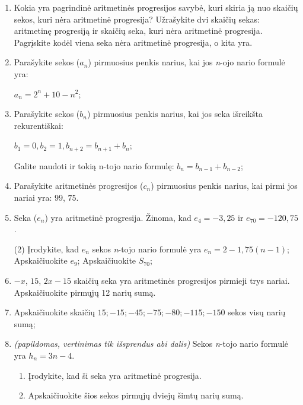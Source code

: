 \documentclass[a4paper]{article}
\begin{document}
\begin{enumerate}
      \item Kokia yra pagrindinė aritmetinės progresijos savybė, kuri skiria ją
            nuo skaičių sekos, kuri nėra aritmetinė progresija? Užrašykite dvi
            skaičių sekas: aritmetinę progresiją ir skaičių seka, kuri nėra
            aritmetinė progresija. Pagrįskite kodėl viena seka nėra
            aritmetinė progresija, o kita yra.

      \item Parašykite sekos ($a_{n}$) pirmuosius penkis
            narius, kai jos \textit{n}-ojo nario formulė yra:

            $a_{n}=2^n+10-n^2$;

      \item Parašykite sekos ($b_{n}$) pirmuosius penkis
            narius, kai jos seka išreikšta rekurentiškai:

            $b_1 = 0, b_2 = 1, b_{n+2}=b_{n+1}+b_{n}$;

            Galite naudoti ir tokią n-tojo nario formulę: 
            $b_{n}=b_{n-1}+b_{n-2}$;

      \item Parašykite aritmetinės progresijos ($c_{n}$) pirmuosius penkis
            narius, kai pirmi jos nariai yra: $99$, $75$.

      \item Seka ($e_{n}$) yra aritmetinė progresija. Žinoma, kad $e_{4}=-3,25$ ir
            $e_{70}=-120,75$.

            \begin{tasks}[item-format={\normalfont}, after-item-skip=2mm](2)
                  \task* Įrodykite, kad $e_{n}$ sekos \textit{n}-tojo nario
                  formulė yra $e_{n}=2-1,75(n-1)$;
                  \task Apskaičiuokite $e_{9}$;
                  \task Apskaičiuokite $S_{70}$;
            \end{tasks}

      \item $ -x $, $ 15 $, $ 2x - 15$ skaičių seka yra aritmetinės progresijos
            pirmieji trys nariai. Apskaičiuokite pirmųjų 12 narių sumą.

      \item Apskaičiuokite skaičių $ 15;-15;-45;-75;-80;-115;-150$ sekos visų narių sumą;

      \item \textit{(papildomas, vertinimas tik išsprendus abi dalis)} Sekos
            \textit{n}-tojo nario formulė yra
            $h_{n} = 3n-4$. 
            \begin{enumerate}[label= (\alph*)]
                  \item Įrodykite, kad ši seka yra aritmetinė progresija.
                  \item Apskaičiuokite šios sekos pirmųjų dviejų šimtų narių
                        sumą.
            \end{enumerate}
\end{enumerate}
\end{document}
